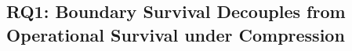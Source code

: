 
\subsection{RQ1: Boundary Survival Decouples from Operational Survival under Compression}
\label{sec:results_rq1}


